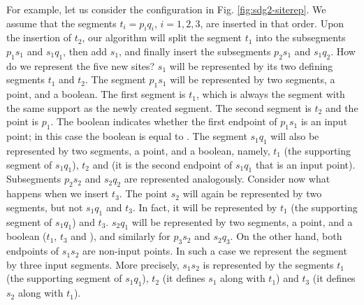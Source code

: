 For example, let us consider the configuration in
Fig. \ref{fig:sdg2-siterep}. We assume that the segments
$t_i=p_iq_i$, $i=1,2,3$, are inserted in that order. Upon the
insertion of $t_2$, our algorithm will split the segment $t_1$ into
the subsegments
$p_1s_1$ and $s_1q_1$, then add $s_1$, and finally insert the
subsegments $p_2s_1$ and $s_1q_2$. How do we represent the five new
sites? $s_1$ will be represented by its two defining segments $t_1$
and $t_2$. The segment $p_1s_1$ will be represented by two segments, a
point, and a boolean. The first segment is $t_1$, which is always the
segment with the same support as the newly created segment. The second
segment is $t_2$ and the point is $p_1$. The boolean indicates whether
the first endpoint of $p_1s_1$ is an input point; in this case the
boolean is equal to . The segment $s_1q_1$ will also be
represented by two segments, a point, and a boolean, namely, $t_1$
(the supporting segment of $s_1q_1$), $t_2$ and  (it is the
second endpoint of $s_1q_1$ that is an input point). Subsegments
$p_2s_2$ and $s_2q_2$ are represented analogously.
Consider now what happens when we insert $t_3$. The point 
$s_2$ will again be represented by two segments, but not $s_1q_1$ and
$t_3$. In fact, it will be represented by $t_1$ (the supporting
segment of $s_1q_1$) and $t_3$. $s_2q_1$ will be represented
by two segments, a point, and a boolean ($t_1$, $t_3$ and
), and similarly for $p_3s_2$ and $s_2q_3$. On the other
hand, both endpoints of $s_1s_2$ are non-input points. In such a
case we represent the segment by three input segments.
More precisely, $s_1s_2$ is represented by the segments $t_1$ (the
supporting segment of $s_1q_1$), $t_2$ (it defines $s_1$ along with
$t_1$) and $t_3$ (it defines $s_2$ along with $t_1$).

